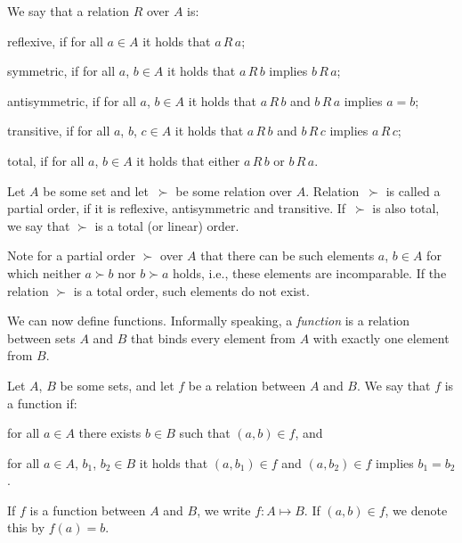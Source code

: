 \begin{definition}
	We say that a relation $R$ over $A$ is:
	\begin{Enumerate}
		\item reflexive, if for all $a\in A$ it holds that $a\,R\,a$;
		\item symmetric, if for all $a$, $b\in A$ it holds that $a\,R\,b$ implies $b\,R\,a$;
		\item antisymmetric, if for all $a$, $b\in A$ it holds that $a\,R\,b$ and $b\,R\,a$ implies $a=b$;
		\item transitive, if for all $a$, $b$, $c\in A$ it holds that $a\,R\,b$ and $b\,R\,c$ implies $a\,R\,c$;
		\item total, if for all $a$, $b\in A$ it holds that either $a\,R\,b$ or $b\,R\,a$.
	\end{Enumerate}
\end{definition}

\begin{definition}
    Let $A$ be some set and let \,$\succ$ be some relation over $A$.
	Relation \,$\succ$ is called a partial order, if it is reflexive, antisymmetric and transitive.
	If \,$\succ$ is also total, we say that $\succ$ is a total (or linear) order.
\end{definition}

Note for a partial order $\succ$ over $A$ that there can be such elements $a$, $b\in A$ for which neither $a\succ b$ nor $b\succ a$ holds, i.e., these elements are incomparable.
If the relation $\succ$ is a total order, such elements do not exist.

We can now define functions.
Informally speaking, a \emph{function} is a relation between sets $A$ and $B$ that binds every element from $A$ with exactly one element from $B$.

\begin{definition}
    Let $A$, $B$ be some sets, and let $f$ be a relation between $A$ and $B$.
	We say that $f$ is a function if:
	\begin{Enumerate}
	    \item for all $a\in A$ there exists $b\in B$ such that $(a,b)\in f$, and
		\item for all $a\in A$, $b_1$, $b_2\in B$ it holds that $(a,b_1)\in f$ and $(a,b_2)\in f$ implies $b_1=b_2$.
	\end{Enumerate}
	If $f$ is a function between $A$ and $B$, we write $f\colon A\mapsto B$.
	If $(a,b)\in f$, we denote this by $f(a)=b$.
\end{definition}

